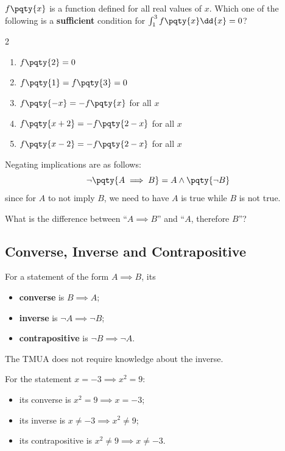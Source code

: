 \documentclass{article}
\begin{document}
\begin{example}[TMUA 2017 P2 Q10]
    \(f\pqty{x}\) is a function defined for all real values of \(x\). Which one of the following is a \textbf{sufficient} condition for \(\int_1^3 f\pqty{x} \dd{x} = 0\)?

    \begin{multicols}{2}
        \begin{enumerate}[label=\Alph*.]
            \item \(f\pqty{2} = 0\)
            \item \(f\pqty{1} = f\pqty{3} = 0\)
            \item \(f\pqty{-x} = - f\pqty{x}\) for all \(x\)
            \item \(f\pqty{x + 2} = - f\pqty{2 - x}\) for all \(x\)
            \item \(f\pqty{x - 2} = - f\pqty{2 - x}\) for all \(x\)
        \end{enumerate}
    \end{multicols}
\end{example}

Negating implications are as follows:
\[
    \lnot \pqty{A \implies B} = A \land \pqty{\lnot B}
\]
since for \(A\) to not imply \(B\), we need to have \(A\) is true while \(B\) is not true.

\begin{problem}
    What is the difference between ``\(A \implies B\)'' and ``\(A\), therefore \(B\)''?
\end{problem}

\subsection{Converse, Inverse and Contrapositive}

For a statement of the form \(A \implies B\), its
\begin{itemize}
    \item \textbf{converse} is \(B \implies A\);
    \item \textbf{inverse} is \(\lnot A \implies \lnot B\);
    \item \textbf{contrapositive} is \(\lnot B \implies \lnot A\).
\end{itemize}

The TMUA does not require knowledge about the inverse.

\begin{example}
    For the statement \(x = -3 \implies x^2 = 9\):
    \begin{itemize}
        \item its converse is \(x^2 = 9 \implies x = -3\);
        \item its inverse is \(x \neq -3 \implies x^2 \neq 9\);
        \item its contrapositive is \(x^2 \neq 9 \implies x \neq -3\).
    \end{itemize}
\end{example}
\end{document}
